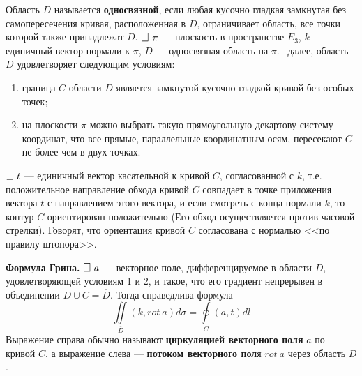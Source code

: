 Область $D$ называется\textbf{ односвязной}, если любая кусочно гладкая замкнутая без самопересечения кривая, расположенная в $D$, ограничивает область, все точки которой также принадлежат $D$.
$\mathLet ~ \pi$ --- плоскость в пространстве $E_3$, $k$ --- единичный вектор нормали к $\pi$, $D$ --- односвязная область на $\pi$. \mathLet \ далее, область $D$ удовлетворяет следующим условиям:
\begin{enumerate}
    \item граница $C$ области $D$ является замкнутой кусочно-гладкой кривой без особых точек;
    \item на плоскости $\pi$ можно выбрать такую прямоугольную декартову систему координат, что все прямые, параллельные координатным осям, пересекают $C$ не более чем в двух точках.
\end{enumerate}

$\mathLet ~ t$ --- единичный вектор касательной к кривой $C$, согласованной с $k$, т.е. положительное направление обхода кривой $C$ совпадает в точке приложения вектора $t$ с направлением этого вектора, и если смотреть с конца нормали $k$, то контур $C$ ориентирован положительно (Его обход осуществляется против часовой стрелки). Говорят, что ориентация кривой $C$ согласована с нормалью <<по правилу штопора>>.




\textbf{Формула Грина.} $\mathLet ~ a$ --- векторное поле, дифференцируемое в области $D$, удовлетворяющей условиям 1 и 2, и такое, что его градиент непрерывен в объединении $D \cup C = \overline{D}$. Тогда справедлива формула
$$\iint\limits_{\overline{D}}(k,rot~a)d\sigma = \oint\limits_{C} (a,t) dl $$
Выражение справа обычно называют \textbf{циркуляцией векторного поля} $a$ по кривой $C$, а выражение слева --- \textbf{потоком векторного пол}я $rot~a$ через область $D$.

